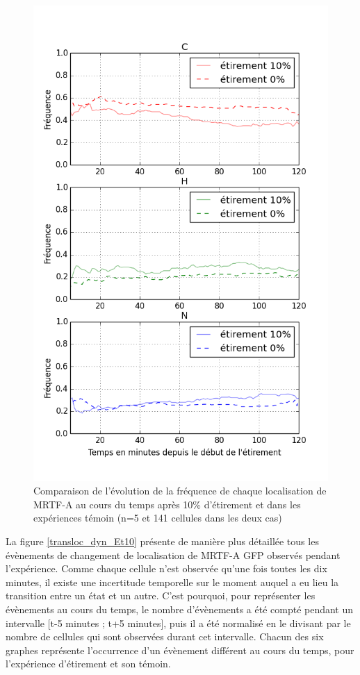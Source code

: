 \documentclass{report}
\begin{document}
\begin{figure}
\includegraphics[scale=0.4]{Figures/Etirement10_vs_0_dynamique.png} 
\caption{\label{CHN_dyn_Et10} Comparaison de l'évolution de la fréquence de chaque localisation de MRTF-A au cours du temps après 10\% d'étirement et dans les expériences témoin (n=5 et 141 cellules dans les deux cas)}
\end{figure}

La figure \ref{transloc_dyn_Et10} présente de manière plus détaillée tous les évènements de changement de localisation de MRTF-A GFP observés pendant l'expérience. 
Comme chaque cellule n'est observée qu'une fois toutes les dix minutes, il existe une incertitude temporelle sur le moment auquel a eu lieu la transition entre un état et un autre. C'est pourquoi, pour représenter les évènements au cours du temps, le nombre d'évènements a été compté pendant un intervalle [t-5 minutes ; t+5 minutes], puis il a été normalisé en le divisant par le nombre de cellules qui sont observées durant cet intervalle. 
Chacun des six graphes représente l'occurrence d'un évènement différent au cours du temps, pour l'expérience d'étirement et son témoin. 
\end{document}
